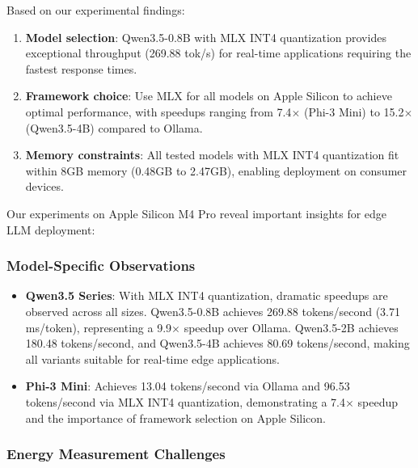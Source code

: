 \documentclass[11pt,a4paper]{article}
\begin{document}
Based on our experimental findings:

\begin{enumerate}[leftmargin=*,nosep]
    \item \textbf{Model selection}: Qwen3.5-0.8B with MLX INT4 quantization provides exceptional throughput (269.88 tok/s) for real-time applications requiring the fastest response times.
    
    \item \textbf{Framework choice}: Use MLX for all models on Apple Silicon to achieve optimal performance, with speedups ranging from 7.4$\times$ (Phi-3 Mini) to 15.2$\times$ (Qwen3.5-4B) compared to Ollama.
    
    \item \textbf{Memory constraints}: All tested models with MLX INT4 quantization fit within 8GB memory (0.48GB to 2.47GB), enabling deployment on consumer devices.
\end{enumerate}



Our experiments on Apple Silicon M4 Pro reveal important insights for edge LLM deployment:



\subsubsection{Model-Specific Observations}

\begin{itemize}[leftmargin=*,nosep]
    \item \textbf{Qwen3.5 Series}: With MLX INT4 quantization, dramatic speedups are observed across all sizes. Qwen3.5-0.8B achieves 269.88 tokens/second (3.71 ms/token), representing a 9.9$\times$ speedup over Ollama. Qwen3.5-2B achieves 180.48 tokens/second, and Qwen3.5-4B achieves 80.69 tokens/second, making all variants suitable for real-time edge applications.
    
    \item \textbf{Phi-3 Mini}: Achieves 13.04 tokens/second via Ollama and 96.53 tokens/second via MLX INT4 quantization, demonstrating a 7.4$\times$ speedup and the importance of framework selection on Apple Silicon.
\end{itemize}
\subsubsection{Energy Measurement Challenges}
\end{document}
